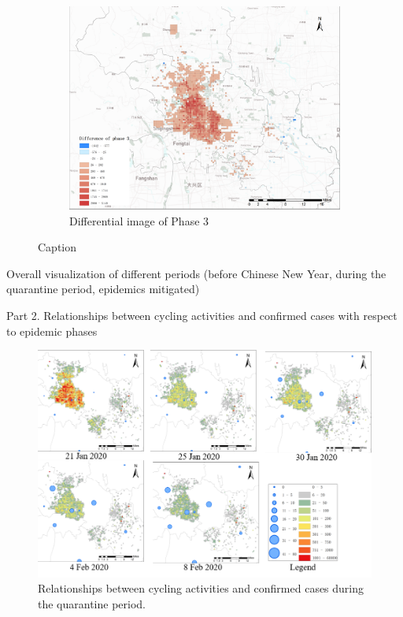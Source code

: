 \documentclass[preprints,ijgi,submit,moreauthors]{Definitions/mdpi}
\begin{document}
\begin{figure}[H]
\begin{subfigure}{.3\textwidth}
        \includegraphics[width=\textwidth]{Figures/dif_p3.png}
        \caption{Differential image of Phase 3}
    \end{subfigure}
    \centering
    \caption{Caption}
    \label{fig:my_label}
\end{figure}

Overall visualization of different periods (before Chinese New Year, during the quarantine period, epidemics mitigated)

Part 2. Relationships between cycling activities and confirmed cases with respect to epidemic phases

\begin{figure}[H]
    \centering
    \includegraphics[width=\textwidth]{Figures/Aggregated counts respect time(phase1+2).png}
    \caption{Relationships between cycling activities and confirmed cases during the quarantine period.}
    \label{fig:BSS and confirmed cases phase 1}
\end{figure}
\end{document}
